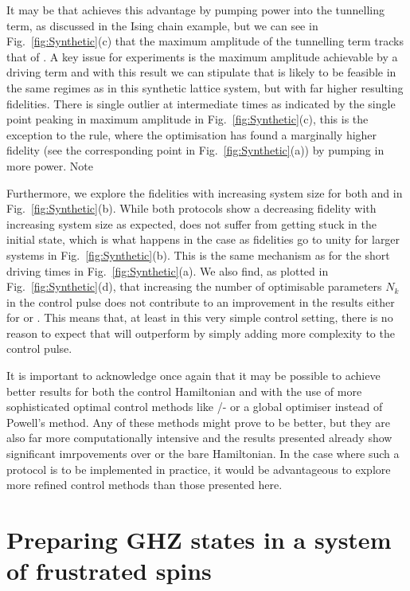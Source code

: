 It may be that  achieves this advantage by pumping power into the tunnelling term, as discussed in the Ising chain example, but we can see in Fig.~\ref{fig:Synthetic}(c) that the maximum amplitude of the tunnelling term tracks that of . A key issue for experiments is the maximum amplitude achievable by a driving term and with this result we can stipulate that  is likely to be feasible in the same regimes as  in this synthetic lattice system, but with far higher resulting fidelities. There is single outlier at intermediate times as indicated by the single point peaking in maximum amplitude in Fig.~\ref{fig:Synthetic}(c), this is the exception to the rule, where the optimisation has found a marginally higher fidelity (see the corresponding point in Fig.~\ref{fig:Synthetic}(a)) by pumping in more power. Note

Furthermore, we explore the fidelities with increasing system size for both  and  in Fig.~\ref{fig:Synthetic}(b). While both protocols show a decreasing fidelity with increasing system size as expected,  does not suffer from getting stuck in the initial state, which is what happens in the  case as fidelities go to unity for larger systems in Fig.~\ref{fig:Synthetic}(b). This is the same mechanism as for the short driving times in Fig.~\ref{fig:Synthetic}(a). We also find, as plotted in Fig.~\ref{fig:Synthetic}(d), that increasing the number of optimisable parameters $N_k$ in the control pulse does not contribute to an improvement in the results either for  or . This means that, at least in this very simple control setting, there is no reason to expect that  will outperform  by simply adding more complexity to the control pulse.

It is important to acknowledge once again that it may be possible to achieve better results for both the control Hamiltonian and  with the use of more sophisticated optimal control methods like /- or a global optimiser instead of Powell's method. Any of these methods might prove to be better, but they are also far more computationally intensive and the results presented already show significant imrpovements over  or the bare Hamiltonian. In the case where such a protocol is to be implemented in practice, it would be advantageous to explore more refined control methods than those presented here.

\section{Preparing GHZ states in a system of frustrated spins}\label{sec:6.4_ghz_states}

